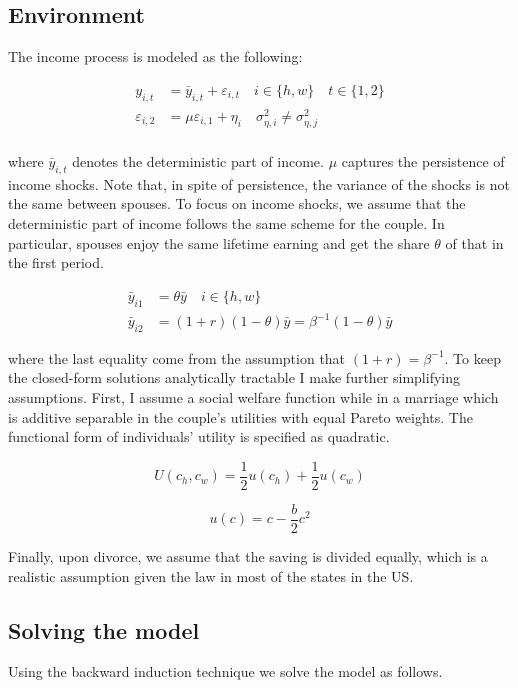 \subsection{Environment}
The income process is modeled as the following:

\begin{align*}
y_{i,t} &= \bar y_{i,t} + \varepsilon_{i,t} \quad i \in \{h,w\} \quad t \in\{1,2\} \\
\varepsilon_{i,2} & = \mu \varepsilon_{i, 1} + \eta_{i} \quad \sigma^2_{\eta,i}\neq \sigma^2_{\eta,j}\\
\end{align*}


\noindent where $\bar y_{i,t}$ denotes the deterministic part of income.  $\mu$ captures the persistence of income shocks. Note that, in spite of persistence, the variance of the shocks is not the same between spouses. To focus on income shocks, we assume that the deterministic part of income follows the same scheme for the couple. In particular, spouses enjoy the same lifetime earning and get the share $\theta$ of that in the first period.

\begin{align*}
\bar y_{i1} & = \theta \bar y  \quad i \in \{h,w\}\\
\bar y_{i2} & =  (1+r) (1 - \theta) \bar y = \beta^{-1} (1- \theta) \bar y
\end{align*}

\noindent where the last equality come from the assumption that \((1+r) = \beta^{-1}\). To keep the closed-form solutions analytically tractable I make further simplifying assumptions. First, I assume a social welfare function while in a marriage which is additive separable in the couple's utilities with equal Pareto weights. The functional form of individuals' utility is specified as quadratic. 

\begin{equation*}
U(c_h, c_w) = \dfrac{1}{2}u(c_h) + \dfrac{1}{2}u(c_w)
\end{equation*}

\begin{equation*}
u(c) = c - \dfrac{b}{2} c^2
\end{equation*}

Finally, upon divorce, we assume that  the saving is divided equally, which is a realistic assumption given the law in most of the states in the US. 

\subsection{Solving the model}
Using the backward induction technique we solve the model as follows.

